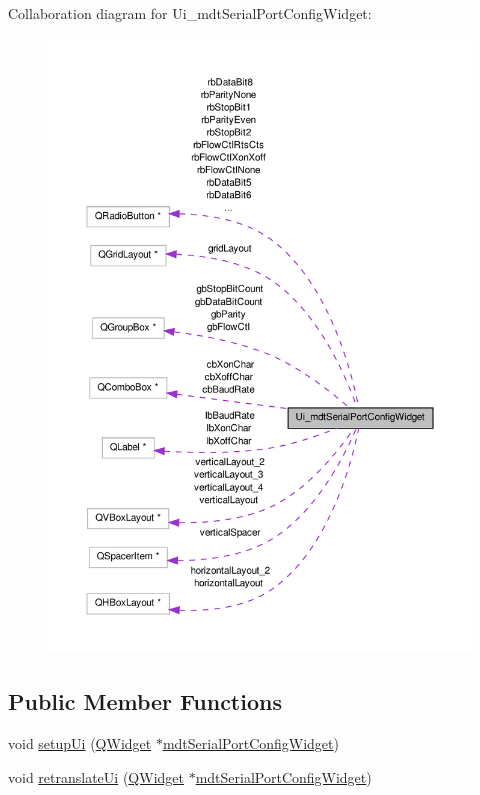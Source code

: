 Collaboration diagram for Ui\-\_\-mdt\-Serial\-Port\-Config\-Widget\-:
\nopagebreak
\begin{figure}[H]
\begin{center}
\leavevmode
\includegraphics[width=350pt]{class_ui__mdt_serial_port_config_widget__coll__graph}
\end{center}
\end{figure}
\subsection*{Public Member Functions}
\begin{DoxyCompactItemize}
\item 
void \hyperlink{class_ui__mdt_serial_port_config_widget_a7bc09917cb653acb79c8ddeee96b5a99}{setup\-Ui} (\hyperlink{class_q_widget}{Q\-Widget} $\ast$\hyperlink{classmdt_serial_port_config_widget}{mdt\-Serial\-Port\-Config\-Widget})
\item 
void \hyperlink{class_ui__mdt_serial_port_config_widget_afdc8635645d12884a6b81ab0217fbdd2}{retranslate\-Ui} (\hyperlink{class_q_widget}{Q\-Widget} $\ast$\hyperlink{classmdt_serial_port_config_widget}{mdt\-Serial\-Port\-Config\-Widget})
\end{DoxyCompactItemize}
